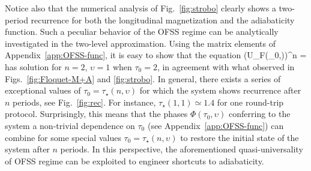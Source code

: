 Notice also that the numerical analysis of Fig.~\ref{fig:strobo} clearly shows a two-period recurrence for both the longitudinal magnetization and the adiabaticity function. Such a peculiar behavior of the OFSS regime can be analytically investigated in the two-level approximation. Using the matrix elements of Appendix~\ref{app:OFSS-func}, it is easy to show that the equation
\be
(U_F(\tau_0,\upsilon))^n = \pm {}
\ee
has solution for $n=2$, $\upsilon=1$ when $\tau_0= 2$, in agreement with what observed in Figs.~\ref{fig:Floquet-M+A} and \ref{fig:strobo}. In general, there exists a series of exceptional values of $\tau_0=\tau_\star(n,\upsilon)$ for which the system shows recurrence after $n$ periods, see Fig.~\ref{fig:rec}. For instance, $\tau_\star(1,1)\simeq 1.4$ for one round-trip protocol. Surprisingly, this means that the phases $\Phi(\tau_0,\upsilon)$ conferring to the system a non-trivial dependence on $\tau_0$ (see Appendix~\ref{app:OFSS-func}) can combine for some special values $\tau_0=\tau_\star(n,\upsilon)$ to restore the initial state of the system after $n$ periods. In this perspective, the aforementioned quasi-universality of OFSS regime can be exploited to engineer shortcuts to adiabaticity.




